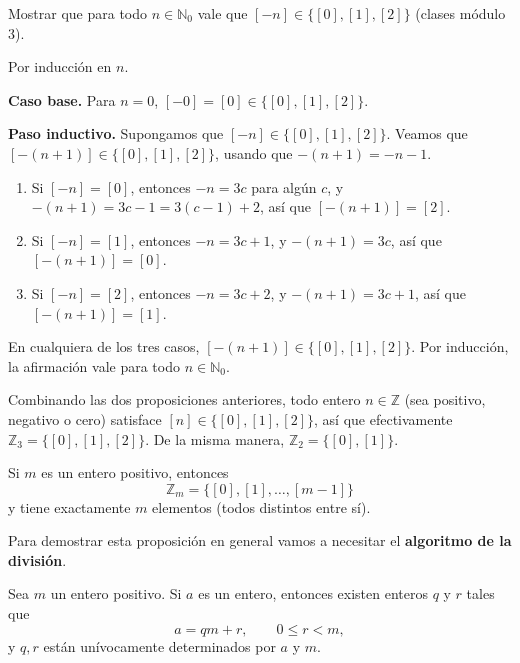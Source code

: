 \begin{ejemplo}
Mostrar que para todo $n \in \mathbb{N}_0$ vale que $[-n] \in
\{[0],[1],[2]\}$ (clases módulo $3$).
\end{ejemplo}

\begin{demostracion}
Por inducción en $n$.

\textbf{Caso base.} Para $n=0$, $[-0]=[0]\in\{[0],[1],[2]\}$.

\textbf{Paso inductivo.} Supongamos que $[-n]\in\{[0],[1],[2]\}$.
Veamos que $[-(n+1)]\in\{[0],[1],[2]\}$, usando que
$-(n+1)=-n-1$.

\begin{enumerate}
    \item Si $[-n]=[0]$, entonces $-n=3c$ para algún $c$, y
    $-(n+1) = 3c-1 = 3(c-1)+2$, así que $[-(n+1)]=[2]$.
    \item Si $[-n]=[1]$, entonces $-n=3c+1$, y
    $-(n+1) = 3c$, así que $[-(n+1)]=[0]$.
    \item Si $[-n]=[2]$, entonces $-n=3c+2$, y
    $-(n+1) = 3c+1$, así que $[-(n+1)]=[1]$.
\end{enumerate}

En cualquiera de los tres casos, $[-(n+1)]\in\{[0],[1],[2]\}$. Por
inducción, la afirmación vale para todo $n\in\mathbb{N}_0$.
\end{demostracion}

\begin{nota}
Combinando las dos proposiciones anteriores, todo entero $n\in
\mathbb{Z}$ (sea positivo, negativo o cero) satisface $[n]\in
\{[0],[1],[2]\}$, así que efectivamente $\mathbb{Z}_3=\{[0],[1],[2]\}$.
De la misma manera, $\mathbb{Z}_2 = \{[0],[1]\}$.
\end{nota}

\begin{proposicion}
Si $m$ es un entero positivo, entonces
\[
\mathbb{Z}_m = \{[0],[1],\dots,[m-1]\}
\]
y tiene exactamente $m$ elementos (todos distintos entre sí).
\end{proposicion}

Para demostrar esta proposición en general vamos a necesitar el
\textbf{algoritmo de la división}.

\begin{proposicion}[{title={Proposición: algoritmo de la división}}]
Sea $m$ un entero positivo. Si $a$ es un entero, entonces existen
enteros $q$ y $r$ tales que
\[
a = qm+r, \qquad 0 \le r < m,
\]
y $q,r$ están unívocamente determinados por $a$ y $m$.
\end{proposicion}

